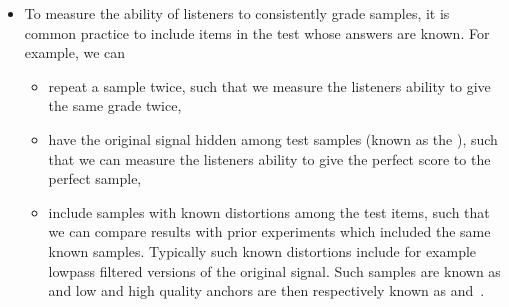 \documentclass[letterpaper,10pt,english]{jupyterBook}
\begin{document}
\begin{itemize}
\item {} 
\sphinxAtStartPar
To measure the ability of listeners to consistently grade samples,
it is common practice to include items in the test whose answers are
known. For example, we can
\begin{itemize}
\item {} 
\sphinxAtStartPar
repeat a sample twice, such that we measure the listeners
ability to give the same grade twice,

\item {} 
\sphinxAtStartPar
have the original  signal hidden among test samples
(known as the ), such that we can measure the
listeners ability to give the perfect score to the perfect
sample,

\item {} 
\sphinxAtStartPar
include samples with known distortions among the test items,
such that we can compare results with prior experiments which
included the same known samples. Typically such known
distortions include for example low\sphinxhyphen{}pass filtered versions of
the original signal. Such samples are known as  and low
and high quality anchors are then respectively known as
 and .

\end{itemize}

\end{itemize}
\end{document}
